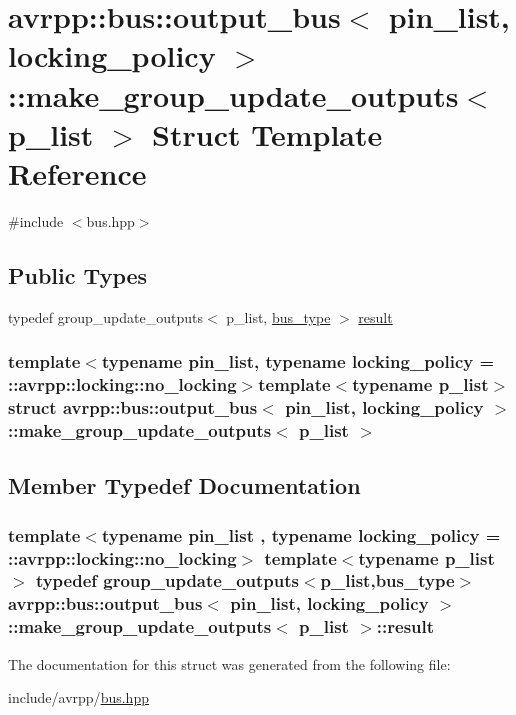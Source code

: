 \hypertarget{structavrpp_1_1bus_1_1output__bus_1_1make__group__update__outputs}{
\section{avrpp::bus::output\_\-bus$<$ pin\_\-list, locking\_\-policy $>$::make\_\-group\_\-update\_\-outputs$<$ p\_\-list $>$ Struct Template Reference}
\label{structavrpp_1_1bus_1_1output__bus_1_1make__group__update__outputs}
}


{\ttfamily \#include $<$bus.hpp$>$}

\subsection*{Public Types}
\begin{DoxyCompactItemize}
\item 
typedef group\_\-update\_\-outputs$<$ p\_\-list, \hyperlink{structavrpp_1_1bus_1_1output__bus_a02bf22de8447c8097a3c77e0f896a3b4}{bus\_\-type} $>$ \hyperlink{structavrpp_1_1bus_1_1output__bus_1_1make__group__update__outputs_ad472c1c8aa3d3e009776ab8c1c5fe5f3}{result}
\end{DoxyCompactItemize}
\subsubsection*{template$<$typename pin\_\-list, typename locking\_\-policy = ::avrpp::locking::no\_\-locking$>$template$<$typename p\_\-list$>$ struct avrpp::bus::output\_\-bus$<$ pin\_\-list, locking\_\-policy $>$::make\_\-group\_\-update\_\-outputs$<$ p\_\-list $>$}



\subsection{Member Typedef Documentation}
\hypertarget{structavrpp_1_1bus_1_1output__bus_1_1make__group__update__outputs_ad472c1c8aa3d3e009776ab8c1c5fe5f3}{
\subsubsection[{result}]{\setlength{\rightskip}{0pt plus 5cm}template$<$typename pin\_\-list , typename locking\_\-policy  = ::avrpp::locking::no\_\-locking$>$ template$<$typename p\_\-list $>$ typedef group\_\-update\_\-outputs$<$p\_\-list,{\bf bus\_\-type}$>$ {\bf avrpp::bus::output\_\-bus}$<$ pin\_\-list, locking\_\-policy $>$::{\bf make\_\-group\_\-update\_\-outputs}$<$ p\_\-list $>$::{\bf result}}}
\label{structavrpp_1_1bus_1_1output__bus_1_1make__group__update__outputs_ad472c1c8aa3d3e009776ab8c1c5fe5f3}


The documentation for this struct was generated from the following file:\begin{DoxyCompactItemize}
\item 
include/avrpp/\hyperlink{bus_8hpp}{bus.hpp}\end{DoxyCompactItemize}
